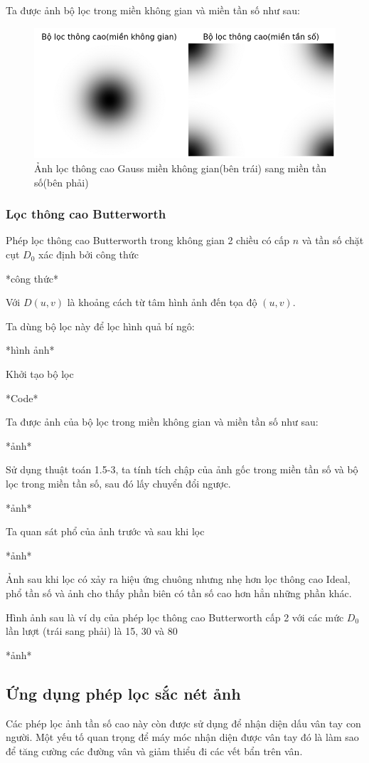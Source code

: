 \documentclass[12pt,a4paper]{report}
\numberwithin{equation}{section}
\theoremstyle{definition} %
\begin{document}
Ta được ảnh bộ lọc trong miền không gian và miền tần số như sau: 
\begin{figure}[H]
\centering
\includegraphics[width=0.8\linewidth]{img/HPGhighlowfilter.png}
\caption{Ảnh lọc thông cao Gauss miền không gian(bên trái) sang miền tần số(bên phải)}
\end{figure}
\subsubsection{Lọc thông cao Butterworth}



Phép lọc thông cao Butterworth trong không gian 2 chiều có cấp $n$ và tần số chặt cụt $D_0$ xác định bởi công thức

*công thức*

Với $D(u,v)$ là khoảng cách từ tâm hình ảnh đến tọa độ $(u,v)$.

Ta dùng bộ lọc này để lọc hình quả bí ngô:

*hình ảnh*

Khởi tạo bộ lọc

*Code*

Ta được ảnh của bộ lọc trong miền không gian và miền tần số như sau:

*ảnh*

Sử dụng thuật toán 1.5-3, ta tính tích chập của ảnh gốc trong miền tần số và bộ lọc trong miền tần số, sau đó lấy chuyển đổi ngược. 

*ảnh*

Ta quan sát phổ của ảnh trước và sau khi lọc

*ảnh*

Ảnh sau khi lọc có xảy ra hiệu ứng chuông nhưng nhẹ hơn lọc thông cao Ideal, phổ tần số và ảnh cho thấy phần biên có tần số cao hơn hẳn những phần khác.

Hình ảnh sau là ví dụ của phép lọc thông cao Butterworth cấp 2 với các mức $D_0$ lần lượt (trái sang phải) là 15, 30 và 80

*ảnh*
\subsection{Ứng dụng phép lọc sắc nét ảnh}
Các phép lọc ảnh tần số cao này còn được sử dụng để nhận diện dấu vân tay con người. Một yếu tố quan trọng để máy móc nhận diện được vân tay đó là làm sao để tăng cường các đường vân và giảm thiểu đi các vết bẩn trên vân. 
\end{document}
